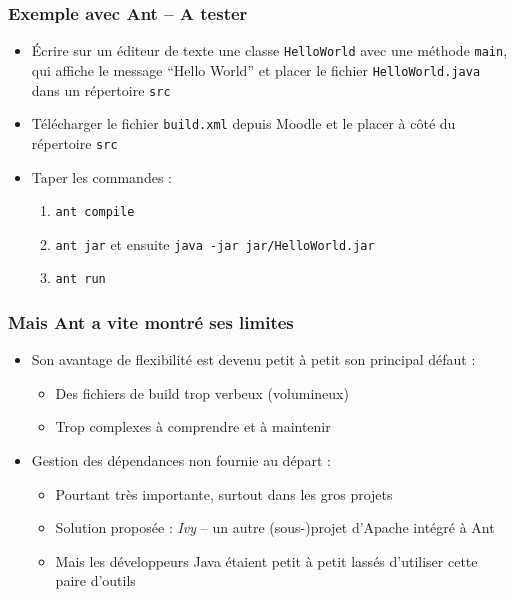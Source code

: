 \documentclass{beamer}
\begin{document}
\begin{frame}[fragile]
  \frametitle{Exemple avec Ant -- A tester}
  \begin{itemize}
  \item Écrire sur un éditeur de texte une classe \texttt{HelloWorld}
    avec une méthode \texttt{main}, qui affiche le message ``Hello
    World'' et placer le fichier \texttt{HelloWorld.java} dans un
    répertoire \texttt{src}
  \item Télécharger le fichier \texttt{build.xml} depuis Moodle et le
    placer à côté du répertoire \texttt{src}
  \item Taper les commandes :
\begin{enumerate}
\item \texttt{ant compile}
\item \texttt{ant jar} et ensuite \texttt{java -jar jar/HelloWorld.jar}
\item \texttt{ant run}
\end{enumerate}  
\end{itemize}

\end{frame}

\begin{frame}[fragile]
  \frametitle{Mais Ant a vite montré ses limites}
\begin{itemize}
\item Son avantage de flexibilité est devenu petit à petit son
  principal défaut :
  \begin{itemize}
  \item Des fichiers de build trop verbeux (volumineux)
  \item Trop complexes à comprendre et à maintenir
  \end{itemize}
\item Gestion des dépendances non fournie au départ :
  \begin{itemize}
  \item Pourtant très importante, surtout dans les gros projets
  \item Solution proposée : \textit{Ivy} -- un autre (sous-)projet
    d'Apache intégré à Ant
  \item Mais les développeurs Java étaient petit à petit lassés
    d'utiliser cette paire d'outils
  \end{itemize}    
\end{itemize}
\end{frame}
\end{document}
